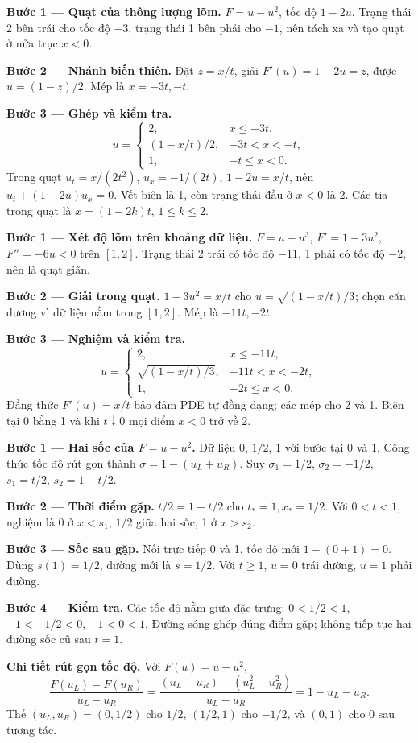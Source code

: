 \textbf{Bước 1 — Quạt của thông lượng lõm.} $F=u-u^2$, tốc độ $1-2u$. Trạng thái 2 bên trái cho tốc độ $-3$, trạng thái 1 bên phải cho $-1$, nên tách xa và tạo quạt ở nửa trục $x<0$.

\textbf{Bước 2 — Nhánh biến thiên.} Đặt $z=x/t$, giải $F'(u)=1-2u=z$, được $u=(1-z)/2$. Mép là $x=-3t,-t$.

\textbf{Bước 3 — Ghép và kiểm tra.}
\[u=\begin{cases}2,&x\le-3t,\\(1-x/t)/2,&-3t<x<-t,\\1,&-t\le x<0.\end{cases}\]
Trong quạt $u_t=x/(2t^2)$, $u_x=-1/(2t)$, $1-2u=x/t$, nên $u_t+(1-2u)u_x=0$. Vết biên là 1, còn trạng thái đầu ở $x<0$ là 2. Các tia trong quạt là $x=(1-2k)t$, $1\le k\le2$.

\textbf{Bước 1 — Xét độ lõm trên khoảng dữ liệu.} $F=u-u^3$, $F'=1-3u^2$, $F''=-6u<0$ trên $[1,2]$. Trạng thái 2 trái có tốc độ $-11$, 1 phải có tốc độ $-2$, nên là quạt giãn.

\textbf{Bước 2 — Giải trong quạt.} $1-3u^2=x/t$ cho $u=\sqrt{(1-x/t)/3}$; chọn căn dương vì dữ liệu nằm trong $[1,2]$. Mép là $-11t,-2t$.

\textbf{Bước 3 — Nghiệm và kiểm tra.}
\[u=\begin{cases}2,&x\le-11t,\\\sqrt{(1-x/t)/3},&-11t<x<-2t,\\1,&-2t\le x<0.\end{cases}\]
Đẳng thức $F'(u)=x/t$ bảo đảm PDE tự đồng dạng; các mép cho 2 và 1. Biên tại 0 bằng 1 và khi $t\downarrow0$ mọi điểm $x<0$ trở về 2.

\textbf{Bước 1 — Hai sốc của $F=u-u^2$.} Dữ liệu 0, $1/2$, 1 với bước tại 0 và 1. Công thức tốc độ rút gọn thành $\sigma=1-(u_L+u_R)$. Suy $\sigma_1=1/2$, $\sigma_2=-1/2$, $s_1=t/2$, $s_2=1-t/2$.

\textbf{Bước 2 — Thời điểm gặp.} $t/2=1-t/2$ cho $t_*=1,x_*=1/2$. Với $0<t<1$, nghiệm là 0 ở $x<s_1$, $1/2$ giữa hai sốc, 1 ở $x>s_2$.

\textbf{Bước 3 — Sốc sau gặp.} Nối trực tiếp 0 và 1, tốc độ mới $1-(0+1)=0$. Dùng $s(1)=1/2$, đường mới là $s=1/2$. Với $t\ge1$, $u=0$ trái đường, $u=1$ phải đường.

\textbf{Bước 4 — Kiểm tra.} Các tốc độ nằm giữa đặc trưng: $0<1/2<1$, $-1<-1/2<0$, $-1<0<1$. Đường sóng ghép đúng điểm gặp; không tiếp tục hai đường sốc cũ sau $t=1$.

\textbf{Chi tiết rút gọn tốc độ.} Với $F(u)=u-u^2$,
\[\frac{F(u_L)-F(u_R)}{u_L-u_R}
=\frac{(u_L-u_R)-(u_L^2-u_R^2)}{u_L-u_R}
=1-u_L-u_R.\]
Thế $(u_L,u_R)=(0,1/2)$ cho $1/2$, $(1/2,1)$ cho $-1/2$, và $(0,1)$ cho $0$ sau tương tác.

